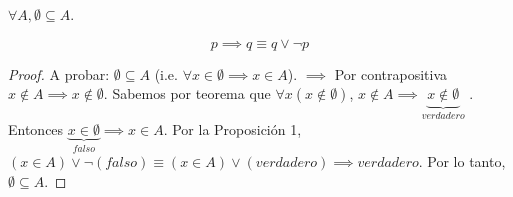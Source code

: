 





	\begin{problema}
		$\forall A, \emptyset \subseteq A$. 
	\end{problema}

\begin{cajita}
	\begin{prop}
		$$p\implies q \equiv q\vee \neg p$$
	\end{prop}
\end{cajita}
\begin{proof}
	A probar: $\emptyset \subseteq A$ (i.e. $\forall x\in \emptyset \implies x\in A$). $\implies$ Por contrapositiva $x\not\in A\implies x\not\in\emptyset$.  Sabemos por teorema que $\forall x(x\not\in \emptyset)$, $x\not\in A\implies \underbrace{x\not\in\emptyset}_{verdadero}$ . Entonces $\underbrace{x\in \emptyset}_{falso} \implies x\in A$. Por la Proposición 1, $(x\in A)\vee \neg(falso)\equiv(x\in A)\vee (verdadero)\implies verdadero $.  Por lo tanto, $\emptyset \subseteq A$. 

\end{proof}





